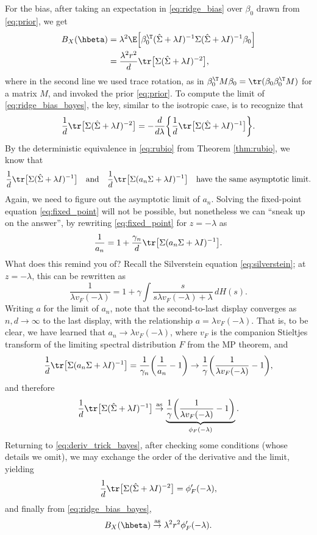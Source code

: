 \documentclass{article}
\begin{document}
For the bias, after taking an expectation in \eqref{eq:ridge_bias} over
$\beta_0$ drawn from \eqref{eq:prior}, we get
\begin{align}
\nonumber
B_X(\hbeta) 
&= \lambda^2 \E \Big[ \beta_0^\T (\hSigma + \lambda I)^{-1} \Sigma (\hSigma + 
  \lambda I)^{-1} \beta_0 \Big] \\
\label{eq:ridge_bias_bayes}
&= \frac{\lambda^2 r^2}{d} \tr \big[ \Sigma (\hSigma + \lambda I)^{-2} \big],
\end{align}
where in the second line we used trace rotation, as in $\beta_0^\T M \beta_0 = 
\tr(\beta_0 \beta_0^\T M)$ for a matrix $M$, and invoked the prior
\eqref{eq:prior}. To compute the limit of \eqref{eq:ridge_bias_bayes}, the key,
similar to the isotropic case, is to recognize that   
\begin{equation}
\label{eq:deriv_trick_bayes}
\frac{1}{d} \tr \big[ \Sigma (\hSigma + \lambda I)^{-2} \big] = -
\frac{d}{d\lambda} \bigg \{ \frac{1}{d} \tr \big[ \Sigma (\hSigma + \lambda  
I)^{-1} \big] \bigg\}.   
\end{equation}
By the deterministic equivalence in \eqref{eq:rubio} from Theorem
\ref{thm:rubio}, we know that
\[
\frac{1}{d} \tr \big[ \Sigma (\hSigma + \lambda I)^{-1} \big] \quad \text{and}
\quad \frac{1}{d} \tr \big[\Sigma (a_n \Sigma + \lambda I)^{-1} \big] \quad
\text{have the same asymptotic limit}.
\]
Again, we need to figure out the asymptotic limit of $a_n$. Solving the
fixed-point equation \eqref{eq:fixed_point} will not be possible, but
nonetheless we can ``sneak up on the answer'', by rewriting
\eqref{eq:fixed_point} for $z = -\lambda$ as
\[
\frac{1}{a_n}  = 1 + \frac{\gamma_n}{d} \tr \big[ \Sigma (a_n \Sigma + \lambda 
I)^{-1} \big]. 
\]
What does this remind you of? Recall the Silverstein equation
\eqref{eq:silverstein}; at $z = -\lambda$, this can be rewritten as     
\[
\frac{1}{\lambda v_F(-\lambda)} = 1 + \gamma \int \frac{s}{s \lambda
  v_F(-\lambda) + \lambda} \, dH(s). 
\]
Writing $a$ for the limit of $a_n$, note that the second-to-last display
converges as $n,d \to \infty$ to the last display, with the relationship $a =
\lambda v_F(-\lambda)$. That is, to be clear, we have learned that $a_n \to
\lambda v_F(-\lambda)$, where $v_F$ is the companion Stieltjes transform of the
limiting spectral distribution $F$ from the MP theorem, and 
\[
\frac{1}{d} \tr \big[ \Sigma (a_n \Sigma + \lambda I)^{-1} \big] =
\frac{1}{\gamma_n} \bigg( \frac{1}{a_n} - 1 \bigg) \to \frac{1}{\gamma} 
\bigg( \frac{1}{\lambda v_F(-\lambda)} - 1 \bigg),
\]
and therefore 
\[
\frac{1}{d} \tr \big[ \Sigma (\hSigma + \lambda I)^{-1} \big] \asto
\underbrace{\frac{1}{\gamma} \bigg( \frac{1}{\lambda v_F(-\lambda)} - 1   
  \bigg)}_{\phi_F(-\lambda)}. 
\]
Returning to \eqref{eq:deriv_trick_bayes}, after checking some conditions (whose 
details we omit), we may exchange the order of the derivative and the limit,
yielding  
\[
\frac{1}{d} \tr \big[ \Sigma (\hSigma + \lambda I)^{-2} \big] =
\phi'_F(-\lambda),
\]
and finally from \eqref{eq:ridge_bias_bayes}, 
\begin{equation}
\label{eq:ridge_bias_bayes_limit}
B_X(\hbeta) \asto \lambda^2 r^2 \phi'_F(-\lambda). 
\end{equation}
\end{document}
